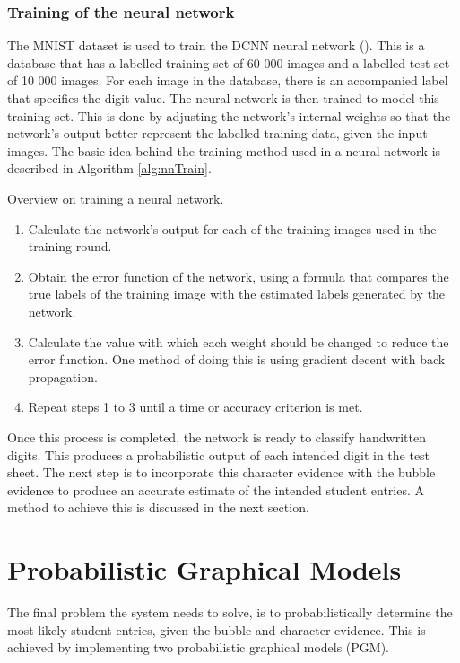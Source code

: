 \subsubsection{Training of the neural network}
\label{sec:trainNN}
The MNIST dataset is used to train the DCNN neural network (\citet{mnist}). This is a database that has a labelled training set of 60 000 images and a labelled test set of 10 000 images. For each image in the database, there is an accompanied label that specifies the digit value. The neural network is then trained to model this training set. This is done by adjusting the network's internal weights so that the network's output better represent the labelled training data, given the input images. The basic idea behind the training method used in a neural network is described in Algorithm \ref{alg:nnTrain}.

\begin{algorithm}[H]
\caption{Overview on training a neural network.}
\label{alg:nnTrain}
\begin{enumerate}
\item Calculate the network's output for each of the training images used in the training round.
\item Obtain the error function of the network, using a formula that compares the true labels of the training image with the estimated labels generated by the network.
\item Calculate the value with which each weight should be changed to reduce the error function. One method of doing this is using gradient decent with back propagation.
\item Repeat steps 1 to 3 until a time or accuracy criterion is met.
\end{enumerate}
\end{algorithm}

Once this process is completed, the network is ready to classify handwritten digits. This produces a probabilistic output of each intended digit in the test sheet. The next step is to incorporate this character evidence with the bubble evidence to produce an accurate estimate of the intended student entries. A method to achieve this is discussed in the next section.

\section{Probabilistic Graphical Models}
\label{sec:PGM}
The final problem the system needs to solve, is to probabilistically determine the most likely student entries, given the bubble and character evidence. This is achieved by implementing two probabilistic graphical models (PGM).


